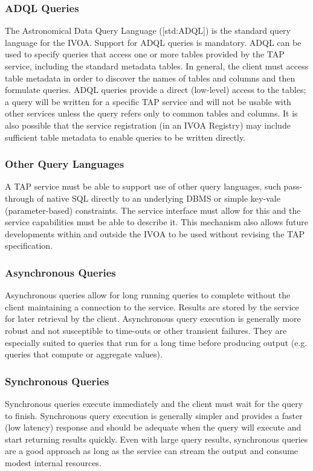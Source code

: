 \documentclass[11pt,letter]{ivoa}
\begin{document}
\subsubsection{ADQL Queries}
The Astronomical Data Query Language ([std:ADQL]) is the standard 
query language for the IVOA. Support for ADQL queries is mandatory. ADQL can be 
used to specify queries  that access one or more tables provided by the TAP 
service, including the standard metadata tables. In general, the client must 
access table metadata in order to discover the names of tables and columns and 
then formulate queries. ADQL queries provide a direct (low-level) access to the 
tables; a query will be written for a specific TAP service and will not be 
usable with other services unless the query refers only to common tables and 
columns. It is also possible that the service registration (in an IVOA Registry) 
may include sufficient table metadata to enable queries to be written directly.

\subsubsection{Other Query Languages}
A TAP service must be able to support use of other query languages, such
pass-through of native SQL directly to an underlying DBMS or simple key-vale 
(parameter-based) constraints. The service interface must allow for 
this and the service capabilities must be able to describe it. This mechanism 
also allows future developments within and outside the IVOA to be used without 
revising the TAP specification.

\subsubsection{Asynchronous Queries}
Asynchronous queries allow for long running queries to complete without 
the client maintaining a connection to the service. Results are stored by 
the service for later retrieval by the client. Asynchronous query 
execution is generally more robust and not susceptible to time-outs or other 
transient failures. They are especially suited to queries that run for a long 
time before producing output (e.g. queries that compute or aggregate values).

\subsubsection{Synchronous Queries}
Synchronous queries execute immediately  and the client must wait for the query 
to finish. Synchronous query execution is generally simpler and provides a 
faster (low latency) response and should be adequate when the query will execute 
and start returning results quickly. Even with large query results, synchronous 
queries are a good approach as long as the service can stream the output 
and consume modest internal resources. 
\end{document}
